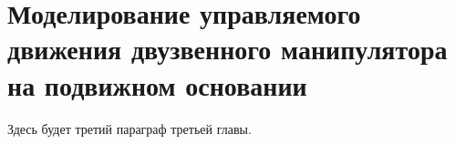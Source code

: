 \section{Моделирование управляемого движения  двузвенного манипулятора на подвижном основании} \label{p33}

Здесь будет третий параграф третьей главы.
